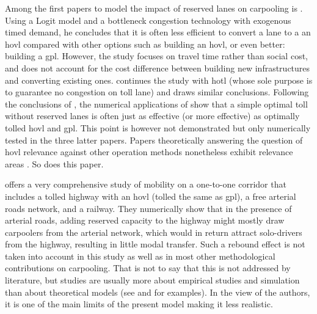 \documentclass[english, a4paper]{article}
\theoremstyle{plain}
\theoremstyle{definition}
\theoremstyle{remark}
\begin{document}
Among the first papers to model the impact of reserved lanes on carpooling is \cite{dahlgren_high_1998}. Using a Logit model and a bottleneck congestion technology with exogenous timed demand, he concludes that it is often less efficient to convert a lane to a an \acrshort{hovl} compared with other options such as building an \acrshort{hovl}, or even better: building a \acrshort{gpl}. However, the study focuses on travel time rather than social cost, and does not account for the cost difference between building new infrastructures and converting existing ones. \cite{dahlgren_high-occupancytoll_2002} continues the study with \acrshort{hotl} (whose sole purpose is to guarantee no congestion on toll lane) and draws similar conclusions. Following the conclusions of \cite{dahlgren_high_1998}, the numerical applications of \cite{yang_carpooling_1999} show that a simple optimal toll without reserved lanes is often just as effective (or more effective) as optimally tolled \acrshort{hovl} and \acrshort{gpl}. This point is however not demonstrated but only numerically tested in the three latter papers. Papers theoretically answering the question of \acrshort{hovl} relevance against other operation methods nonetheless exhibit relevance areas \parencites{konishi_carpooling_2010, xiao_tradable_2021, xiao_temporal-spatial_2021}. So does this paper.

\cite{qian_modeling_2011} offers a very comprehensive study of mobility on a one-to-one corridor that includes a tolled highway with an \acrshort{hovl} (tolled the same as \acrshort{gpl}), a free arterial roads network, and a railway. They numerically show that in the presence of arterial roads, adding reserved capacity to the highway might mostly draw carpoolers from the arterial network, which would in return attract solo-drivers from the highway, resulting in little modal transfer. Such a rebound effect is not taken into account in this study as well as in most other methodological contributions on carpooling. That is not to say that this is not addressed by literature, but studies are usually more about empirical studies and simulation than about theoretical models (see \cite{coulombel_substantial_2019} and \cite{olave-cruz_does_2025} for examples). In the view of the authors, it is one of the main limits of the present model making it less realistic.
\end{document}
